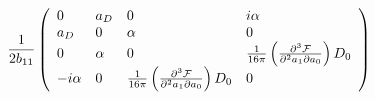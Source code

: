 \begin{equation}
\frac{1}{2{b}_{11}}\left( 
\begin{array}{llll}
0 & a_{D} & 0 & i\alpha \\ 
a_{D} & 0 & \alpha & 0 \\ 
0 & \alpha & 0 & \frac{1}{16\pi }\left( \frac{\partial ^{3}\mathcal{F}}{%
\partial ^{2}a_{1}\partial a_{0}}\right) D_0 \\ 
-i\alpha & 0 & \frac{1}{16\pi }\left( \frac{\partial ^{3}\mathcal{F}}{%
\partial ^{2}a_{1}\partial a_{0}}\right) D_0 & 0
\end{array}
\right) 
\label{fermmass}
\end{equation}

